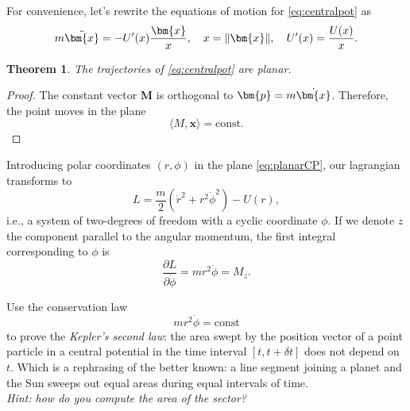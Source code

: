 \documentclass[english,fontsize=11pt,paper=a5,oneside]{scrbook}
\newcommand{\bx}{\bm{x}}
\newcommand{\bp}{\bm{p}}
\newcommand{\lag}{\langle}
\newcommand{\rag}{\rangle}
\let\d\relax
\newcommand{\d}{\mathrm{d}}
\newtheorem{theorem}{Theorem}[chapter]
\theoremstyle{definition}
\newenvironment{exercise}
  {\pushQED{\qed}\renewcommand{\qedsymbol}{$\maltese$}\exercisex}
  {\popQED\endexercisex}
\begin{document}
For convenience, let's rewrite the equations of motion for \eqref{eq:centralpot} as
\begin{equation}
  m\ddot \bx = - U'(x)\frac{\bx}{x}, \quad x = \|\bx\|, \quad U'(x)=\frac{\d U(x)}{\d x}.
\end{equation}

\begin{theorem}
  The trajectories of \eqref{eq:centralpot} are planar.
\end{theorem}
\begin{proof}
  The constant vector $\bm{M}$ is orthogonal to $\bp = m \dot \bx$.
  Therefore, the point moves in the plane
  \begin{equation}\label{eq:planarCP}
    \lag M, \bx\rag = \mathrm{const}.
  \end{equation}
\end{proof}

Introducing polar coordinates $(r,\phi)$ in the plane \eqref{eq:planarCP}, our lagrangian transforms to
\begin{equation}
  L = \frac{m}{2} \left(\dot r^2 + r^2 \dot \phi^2\right) - U(r),
\end{equation}
i.e., a system of two-degrees of freedom with a cyclic coordinate $\phi$.
If we denote $z$ the component parallel to the angular momentum, the first integral corresponding to $\phi$ is
\begin{equation}\label{eq:cyclicphi}
  \frac{\partial L}{\partial \dot \phi} = m r^2 \dot \phi = M_z.
\end{equation}

\begin{exercise}
  Use the conservation law
  \begin{equation}
    m r^2 \dot \phi = \mathrm{const}
  \end{equation}
  to prove the \emph{Kepler's second law}: the area swept by the position vector of a point particle in a central potential in the time interval $[t, t+\delta t]$ does not depend on $t$. Which is a rephrasing of the better known: a line segment joining a planet and the Sun sweeps out equal areas during equal intervals of time.\\
  \textit{Hint: how do you compute the area of the sector?}
\end{exercise}
\end{document}
